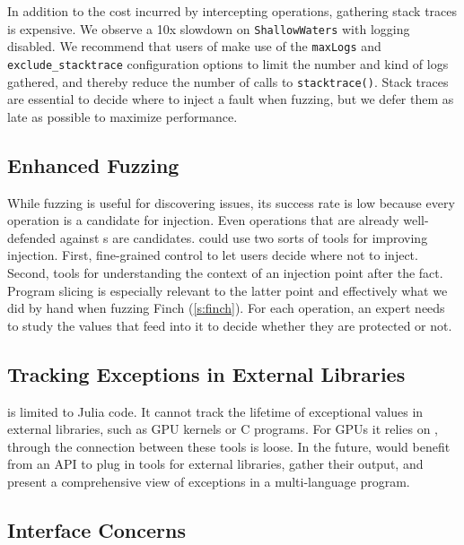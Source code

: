 \documentclass{juliacon}
\begin{document}
In addition to the cost incurred by intercepting \fp{} operations, gathering stack traces is expensive.
We observe a 10x slowdown on \texttt{ShallowWaters} with logging disabled.
We recommend that users of \FT{} make use of the \texttt{maxLogs} and \texttt{exclude\_stacktrace} configuration options to limit the number and kind of logs gathered, and thereby reduce the number of calls to \texttt{stacktrace()}.
Stack traces are essential to decide where to inject a fault when fuzzing,
but we defer them as late as possible to maximize performance.


\subsection{Enhanced Fuzzing}

While fuzzing is useful for discovering issues, its success rate
is low because {every} \fp{} operation is a candidate
for injection.
Even operations that are already well-defended against \NaN{}s are candidates.
\FT{} could use two sorts of tools for improving injection.
First, fine-grained control to let users decide where not to inject.
Second, tools for understanding the context of an injection point
after the fact.
Program slicing is especially relevant to the latter point and effectively
what we did by hand when fuzzing Finch (\cref{s:finch}).
For each operation, an expert needs to study the values that feed into it to
decide whether they are protected or not.


\subsection{Tracking Exceptions in External Libraries}

\FT{} is limited to Julia code.
It cannot track the lifetime of exceptional values in external libraries, such as GPU kernels or C programs.
For GPUs it relies on \GPUFPX{}, through the connection between these tools is loose.
In the future, \FT{} would benefit from an API to plug in tools for external libraries, gather their output,
and present a comprehensive view of exceptions in a multi-language program.


\subsection{Interface Concerns}
\end{document}
